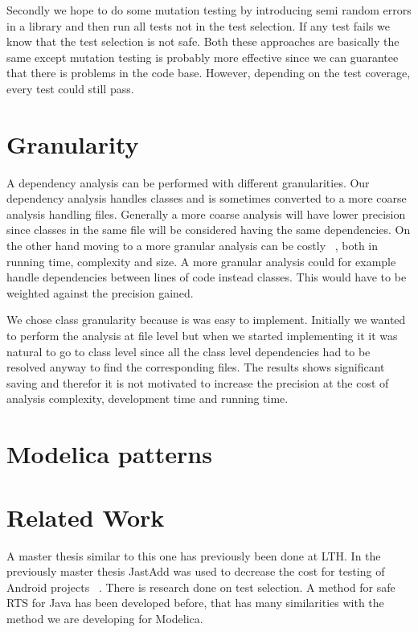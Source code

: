 \documentclass{cslthse-msc}
\begin{document}
Secondly we hope to do some mutation testing by introducing semi random errors in a library and then run all tests not in the test selection. If any test fails we know that the test selection is not safe. Both these approaches are basically the same except mutation testing is probably more effective since we can guarantee that there is problems in the code base. However, depending on the test coverage, every test could still pass.


\section{Granularity}
A dependency analysis can be performed with different granularities. Our dependency analysis handles classes and is sometimes converted to a more coarse analysis handling files. Generally a more coarse analysis will have lower precision since classes in the same file will be considered having the same dependencies. On the other hand moving to a more granular analysis can be costly ~\cite{DBLP:conf/sigsoft/LegunsenHSLZM16}, both in running time, complexity and size. A more granular analysis could for example handle dependencies between lines of code instead classes. This would have to be weighted against the precision gained.

We chose class granularity because is was easy to implement. Initially we wanted to perform the analysis at file level but when we started implementing it it was natural to go to class level since all the class level dependencies had to be resolved anyway to find the corresponding files. The results shows significant saving and therefor it is not motivated to increase the precision at the cost of analysis complexity, development time and running time.

\section{Modelica patterns}


\section{Related Work}
A master thesis similar to this one has previously been done at LTH. In the previously master thesis JastAdd was used to decrease the cost for testing of Android projects ~\cite{kampe2012dependroid}. There is research done on test selection. A method for safe RTS for Java has been developed before, that has many similarities with the method we are developing for Modelica. 
\end{document}
